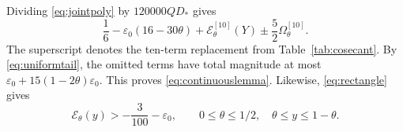 \documentclass[11pt]{amsart}
\theoremstyle{remark}
\theoremstyle{plain}
\numberwithin{equation}{section}
\begin{document}
Dividing \eqref{eq:jointpoly} by \(120000QD_*\) gives
\[
 \frac16-\varepsilon_0(16-30\theta)
 +\mathcal E_\theta^{[10]}(Y)
 \pm\frac52\Omega_\theta^{[10]}.
\]
The superscript denotes the ten-term replacement from
Table~\ref{tab:cosecant}.
By \eqref{eq:uniformtail}, the omitted terms have total magnitude
at most
\(\varepsilon_0+15(1-2\theta)\varepsilon_0\).
This proves \eqref{eq:continuouslemma}.
Likewise, \eqref{eq:rectangle} gives
\begin{equation}\label{eq:rectanglebound}
 \mathcal E_\theta(y)>-\frac3{100}-\varepsilon_0,
 \qquad
 0\le\theta\le1/2,\quad\theta\le y\le1-\theta.
\end{equation}

\begingroup
\small


\endgroup
\end{document}
